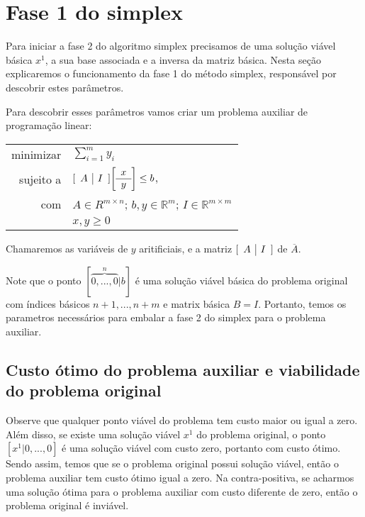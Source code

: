 \documentclass[12pt]{article}
\begin{document}
\newpage
\section{Fase 1 do simplex}
	Para iniciar a fase 2 do algoritmo simplex precisamos de uma solução viável básica $x^1$, a sua base associada e a inversa da matriz básica. Nesta seção explicaremos o funcionamento da fase 1 do método simplex, responsável por descobrir estes parâmetros.

Para descobrir esses parâmetros vamos criar um problema auxiliar de programação linear:

\begin{center}
	\begin{tabular}{r l}
		minimizar & $\sum_{i = 1}^{m} y_i$ \\
		sujeito a & $
					[\begin{array}{c | c}
						A & I
					\end{array}]
					
					\bigg[\begin{array}{c}
						x \\
						\hline
						y
					\end{array}\bigg]
					
					\leq b$, \\
			com   &	$A \in R^{m \times n}$; $b, y \in \mathbb{R}^m$; $I \in \mathbb{R}^{m \times m}$ \\
            & $x, y \geq 0$
	\end{tabular}
\end{center}
Chamaremos as variáveis de $y$ aritificiais, e a matriz $[\begin{array}{c | c} A & I	\end{array}]$ de $\overline{A}$.

Note que o ponto $[\overbrace{0, ..., 0}^{n}|b]$ é uma solução viável básica do problema original com índices básicos $n + 1, ..., n + m$ e matrix básica $B = I$. Portanto, temos os parametros necessários para embalar a fase 2 do simplex para o problema auxiliar.



\subsection{Custo ótimo do problema auxiliar e viabilidade do problema original}
\label{fase2:custo_otimo}
Observe que qualquer ponto viável do problema tem custo maior ou igual a zero. Além disso, se existe uma solução viável $x^1$ do problema original, o ponto $[x^1 | 0, ..., 0]$ é uma solução viável com custo zero, portanto com custo ótimo. Sendo assim, temos que se o problema original possui solução viável, então o problema auxiliar tem custo ótimo igual a zero. Na contra-positiva, se acharmos uma solução ótima para o problema auxiliar com custo diferente de zero, então o problema original é inviável.
\end{document}
